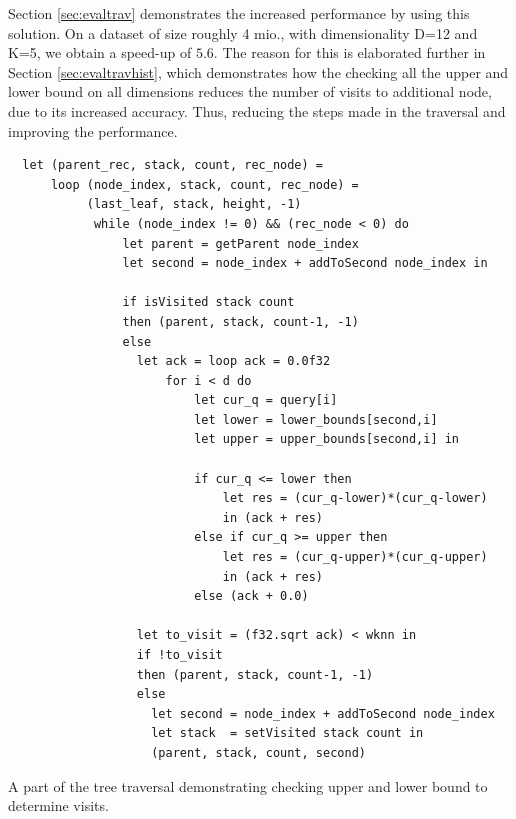 \noindent Section \ref{sec:evaltrav} demonstrates the increased performance by using this solution. On a dataset of size roughly 4 mio., with dimensionality D=12 and K=5, we obtain a speed-up of $5.6$. The reason for this is elaborated further in Section \ref{sec:evaltravhist}, which demonstrates how the checking all the upper and lower bound on all dimensions reduces the number of visits to additional node, due to its increased accuracy. Thus, reducing the steps made in the traversal and improving the performance. 


\begin{listing}[H]
\begin{verbatim}
  let (parent_rec, stack, count, rec_node) =
      loop (node_index, stack, count, rec_node) =
           (last_leaf, stack, height, -1)
            while (node_index != 0) && (rec_node < 0) do
                let parent = getParent node_index
                let second = node_index + addToSecond node_index in

                if isVisited stack count
                then (parent, stack, count-1, -1)
                else
                  let ack = loop ack = 0.0f32
                      for i < d do
                          let cur_q = query[i]
                          let lower = lower_bounds[second,i]
                          let upper = upper_bounds[second,i] in

                          if cur_q <= lower then
                              let res = (cur_q-lower)*(cur_q-lower)
                              in (ack + res)
                          else if cur_q >= upper then
                              let res = (cur_q-upper)*(cur_q-upper)
                              in (ack + res)
                          else (ack + 0.0)

                  let to_visit = (f32.sqrt ack) < wknn in
                  if !to_visit
                  then (parent, stack, count-1, -1)
                  else
                    let second = node_index + addToSecond node_index
                    let stack  = setVisited stack count in
                    (parent, stack, count, second)
\end{verbatim}
\caption{A part of the tree traversal demonstrating checking upper and lower bound to determine visits.}
\label{lst:traverse1}
\end{listing}




